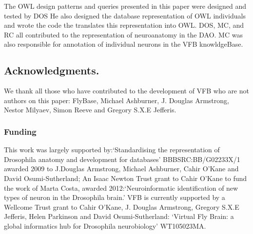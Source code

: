 \documentclass[runningheads,a4paper]{llncs}
\begin{document}
The OWL design patterns and queries presented in this paper were designed and
tested by DOS  He also designed the database representation of OWL
individuals and wrote the code the translates this representation into
OWL. DOS, MC, and RC all contributed to the representation of
neuroanatomy in the  DAO.  MC  was also responsible for annotation of
individual neurons in the VFB knowldgeBase.

\subsection*{Acknowledgments.}

We thank all those who have contributed to the development of VFB who
are not authors on this paper: FlyBase, Michael Ashburner, J. Douglas
Armstrong, Nestor Milyaev, Simon Reeve and Gregory S.X.E Jefferis.

\subsubsection*{Funding}

This work was largely supported by:`Standardising the representation of
Drosophila anatomy and development for databases' 
BBBSRC:BB/G02233X/1 awarded 2009 to J.Douglas Armstrong, Michael 
Ashburner, Cahir O'Kane and David Osumi-Sutherland;  An Isaac Newton
Trust grant to Cahir O'Kane to fund the work of Marta Costa, awarded
2012:`Neuroinformatic identification of new types of neuron in the
Drosophila brain.' VFB is currently supported by a Wellcome Trust
grant to Cahir O'Kane, J. Douglas Armstrong, Gregory S.X.E Jefferis,
Helen Parkinson and David Osumi-Sutherland: `Virtual Fly Brain: a
global informatics hub for Drosophila neurobiology' WT105023MA.





\end{document}
